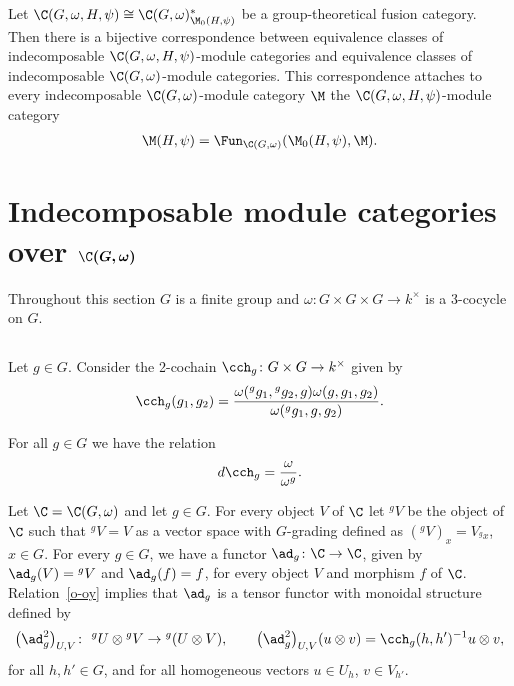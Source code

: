 Let $\C(G, \omega, H, \psi) \cong \C(G, \omega)^*_{\M_0(H, \psi)}$ be a group-theoretical fusion category. Then there is a bijective correspondence between equivalence classes of indecomposable $\C(G, \omega, H, \psi)$-module categories and equivalence classes of indecomposable $\C(G, \omega)$-module categories. This correspondence attaches to every indecomposable $\C(G, \omega)$-module category $\M$ the $\C(G, \omega, H, \psi)$-module category
\begin{gather*}\M(H, \psi) = \Fun_{\C(G, \omega)}(\M_0(H, \psi), \M). \end{gather*}

\section[Indecomposable module categories over $\C(G, \omega)$]{Indecomposable module categories over $\boldsymbol{\C(G, \omega)}$}\label{ptd-mc}

Throughout this section $G$ is a f\/inite group and $\omega \colon G \times G \times G \to k^\times$ is a 3-cocycle on $G$.

\subsection{}\label{adj-action} Let $g \in G$. Consider the 2-cochain $\cch_g\colon G \times G \to k^{\times}$ given by
\begin{gather*}\cch_g(g_1, g_2) = \frac{\omega({}^gg_1, {}^gg_2, g) \omega(g, g_1, g_2)}{\omega({}^gg_1, g, g_2)}.
\end{gather*}

For all $g \in G$ we have the relation
\begin{gather}\label{o-oy}d\cch_g = \frac{\omega}{\omega^g}.
\end{gather}

Let $\C = \C(G, \omega)$ and let $g \in G$. For every object $V$ of $\C$ let ${}^g V$ be the object of $\C$ such that $^gV = V$ as a vector space with $G$-grading def\/ined as $({}^gV)_x = V_{^g x}$, $x \in G$. For every $g \in G$, we have a functor $\ad_g \colon \C \to \C$, given by $\ad_g(V) = {}^gV$ and $\ad_g(f) = f$, for every object $V$ and morphism $f$ of $\C$.
Relation~\eqref{o-oy} implies that $\ad_g$ is a tensor functor with monoidal structure def\/ined by
\begin{gather*}\big(\ad_g^2\big)_{U, V}\colon \ {}^gU \otimes {}^gV \to {}^g (U \otimes V), \qquad \big(\ad_g^2\big)_{U, V} (u \otimes v) = \cch_g(h, h')^{-1} u\otimes v,\end{gather*}
for all $h, h' \in G$, and for all homogeneous vectors $u \in U_h$, $v \in V_{h'}$.

